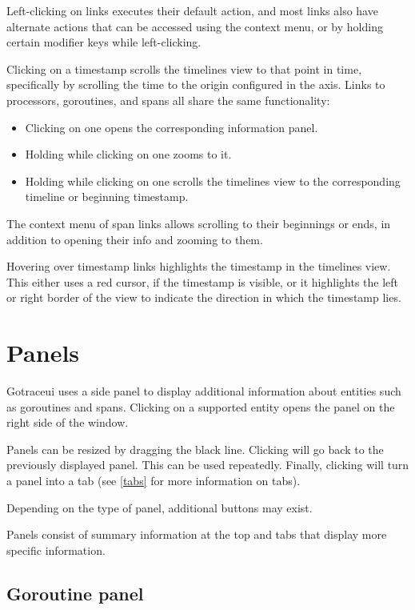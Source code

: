 \documentclass[10pt,letterpaper,oneside,openany,english]{memoir}
\newcommand{\shortcut}{\ctrl{} or \cmdmac}
\begin{document}
Left-clicking on links executes their default action,
and most links also have alternate actions that can be accessed using the context menu,
or by holding certain modifier keys while left-clicking.

Clicking on a timestamp scrolls the timelines view to that point in time, specifically by scrolling the time to the origin configured in the axis.
Links to processors, goroutines, and spans all share the same functionality:
\begin{itemize}
\item Clicking on one opens the corresponding information panel.
\item Holding \keys{\shortcut} while clicking on one zooms to it.
\item Holding \keys{\shift} while clicking on one scrolls the timelines view to the corresponding timeline or beginning timestamp.
\end{itemize}

The context menu of span links allows scrolling to their beginnings or ends, in addition to opening their info and zooming to them.

Hovering over timestamp links highlights the timestamp in the timelines view.
This either uses a red cursor, if the timestamp is visible,
or it highlights the left or right border of the view to indicate the direction in which the timestamp lies.

\section{Panels}\label{panels}

Gotraceui uses a side panel to display additional information about entities such as goroutines and spans.
Clicking on a supported entity opens the panel on the right side of the window.

Panels can be resized by dragging the black line.
Clicking  will go back to the previously displayed panel. This can be used repeatedly.
Finally, clicking  will turn a panel into a tab (see \cref{tabs} for more information on tabs).

Depending on the type of panel, additional buttons may exist.

Panels consist of summary information at the top and tabs that display more specific information.

\subsection{Goroutine panel}
\end{document}
